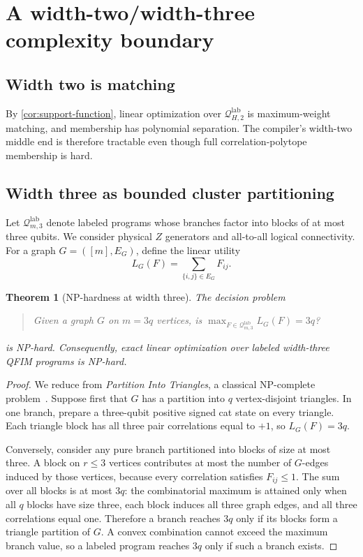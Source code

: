 \documentclass[11pt]{article}
\newtheorem{theorem}{Theorem}[section]
\theoremstyle{definition}
\theoremstyle{remark}
\newcommand{\Q}{\mathcal{Q}}
\newcommand{\lab}{\mathrm{lab}}
\begin{document}
\section{A width-two/width-three complexity boundary}

\subsection{Width two is matching}
By \cref{cor:support-function}, linear optimization over $\Q^{\lab}_{H,2}$ is maximum-weight matching, and membership has polynomial separation. The compiler's width-two middle end is therefore tractable even though full correlation-polytope membership is hard.

\subsection{Width three as bounded cluster partitioning}
Let $\Q^{\lab}_{m,3}$ denote labeled programs whose branches factor into blocks of at most three qubits. We consider physical $Z$ generators and all-to-all logical connectivity. For a graph $G=([m],E_G)$, define the linear utility
\begin{equation}
  L_G(F)=\sum_{\{i,j\}\in E_G}F_{ij}.
  \label{eq:triangle-objective}
\end{equation}

\begin{theorem}[NP-hardness at width three]
\label{thm:width-three-hardness}
The decision problem
\begin{quote}
Given a graph $G$ on $m=3q$ vertices, is
$\max_{F\in\Q^{\lab}_{m,3}}L_G(F)=3q$?
\end{quote}
is NP-hard. Consequently, exact linear optimization over labeled width-three QFIM programs is NP-hard.
\end{theorem}

\begin{proof}
We reduce from \emph{Partition Into Triangles}, a classical NP-complete problem~\cite{GareyJohnson1979}. Suppose first that $G$ has a partition into $q$ vertex-disjoint triangles. In one branch, prepare a three-qubit positive signed cat state on every triangle. Each triangle block has all three pair correlations equal to $+1$, so $L_G(F)=3q$.

Conversely, consider any pure branch partitioned into blocks of size at most three. A block on $r\le3$ vertices contributes at most the number of $G$-edges induced by those vertices, because every correlation satisfies $F_{ij}\le1$. The sum over all blocks is at most $3q$: the combinatorial maximum is attained only when all $q$ blocks have size three, each block induces all three graph edges, and all three correlations equal one. Therefore a branch reaches $3q$ only if its blocks form a triangle partition of $G$. A convex combination cannot exceed the maximum branch value, so a labeled program reaches $3q$ only if such a branch exists.
\end{proof}
\end{document}
